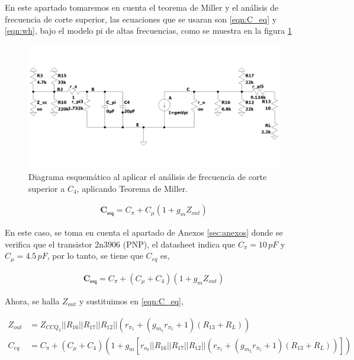 \begin{enumerate}
\begin{itemize}
                En este apartado tomaremos en cuenta el teorema de Miller y el análisis de frecuencia de corte superior, las ecuaciones que se usaran son \ref{eqn:C_eq} y \ref{eqn:wh}, bajo el modelo pi de altas frecuencias, como se muestra en la figura \ref{fig:c4}

                \begin{figure}[H]
                  \centering
                  \includegraphics[width=\textwidth]{Imagenes/c4.png}
                  \caption{Diagrama esquemático al aplicar el análisis de frecuencia de corte superior a $C_4$, aplicando Teorema de Miller.}
                  \label{fig:c4}
                \end{figure}

                \begin{align*}
                  \mathbf{C_{eq}} = C_{\pi} + C_{\mu}(1+g_mZ_{out})
                \end{align*}

                En este caso, se toma en cuenta el apartado de Anexos \ref{sec:anexos} donde se verifica que el transistor 2n3906 (PNP), el datasheet indica que $C_{\pi}=10 \, pF$ y $C_{\mu}=4.5 \, pF$, por lo tanto, se tiene que $C_{eq}$ es,

                \begin{align*}
                  \mathbf{C_{eq}} =C_{\pi}+ (C_{\mu}+C_4)(1+g_mZ_{out})
                \end{align*}

                Ahora, se halla $Z_{out}$ y sustituimos en \ref{eqn:C_eq},

                \begin{align*}
                  Z_{out} & =Z_{CCQ_3}||R_{16}||R_{17}||R_{12}||(r_{\pi_5}+(g_{m_5}r_{\pi_5}+1)(R_{13}+R_L))                                  \\[1cm]
                  C_{eq}  & =C_{\pi}+ (C_{\mu} + C_{4})(1+g_m[r_{o_3}||R_{16}||R_{17}||R_{12}||(r_{\pi_5}+(g_{m_5}r_{\pi_5}+1)(R_{13}+R_L))])
                \end{align*}


\end{itemize}
\end{enumerate}

